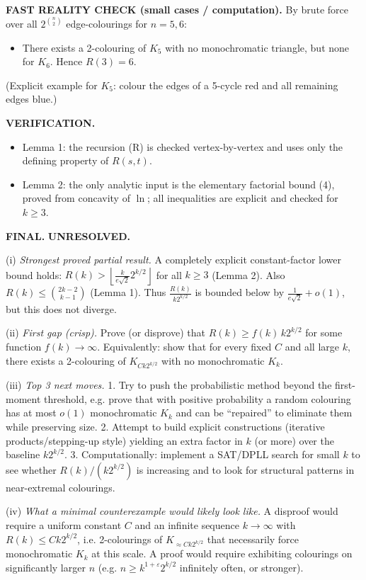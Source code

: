 \medskip
\textbf{FAST REALITY CHECK (small cases / computation).}
By brute force over all $2^{\binom{n}{2}}$ edge-colourings for $n=5,6$:
\begin{itemize}
\item There exists a 2-colouring of $K_5$ with no monochromatic triangle, but none for $K_6$.
Hence $R(3)=6$.
\end{itemize}
(Explicit example for $K_5$: colour the edges of a 5-cycle red and all remaining edges blue.)

\textbf{VERIFICATION.}
\begin{itemize}
\item Lemma 1: the recursion (R) is checked vertex-by-vertex and uses only the defining property of $R(s,t)$.
\item Lemma 2: the only analytic input is the elementary factorial bound (4), proved from concavity of $\ln$; all inequalities are explicit and checked for $k\ge 3$.
\end{itemize}

\textbf{FINAL.} \textbf{UNRESOLVED.}

(i) \emph{Strongest proved partial result.} A completely explicit constant-factor lower bound holds:
$R(k) > \left\lfloor \frac{k}{e\sqrt{2}}2^{k/2}\right\rfloor$ for all $k\ge 3$ (Lemma 2). Also $R(k)\le \binom{2k-2}{k-1}$ (Lemma 1).
Thus $\frac{R(k)}{k2^{k/2}}$ is bounded below by $\frac{1}{e\sqrt{2}}+o(1)$, but this does not diverge.

(ii) \emph{First gap (crisp).} Prove (or disprove) that $R(k)\ge f(k)\,k2^{k/2}$ for some function $f(k)\to\infty$.
Equivalently: show that for every fixed $C$ and all large $k$, there exists a 2-colouring of $K_{Ck2^{k/2}}$ with no monochromatic $K_k$.

(iii) \emph{Top 3 next moves.}
1. Try to push the probabilistic method beyond the first-moment threshold, e.g. prove that with positive probability a random colouring has at most $o(1)$ monochromatic $K_k$ and can be ``repaired'' to eliminate them while preserving size.
2. Attempt to build explicit constructions (iterative products/stepping-up style) yielding an extra factor in $k$ (or more) over the baseline $k2^{k/2}$.
3. Computationally: implement a SAT/DPLL search for small $k$ to see whether $R(k)/(k2^{k/2})$ is increasing and to look for structural patterns in near-extremal colourings.

(iv) \emph{What a minimal counterexample would likely look like.} A disproof would require a uniform constant $C$ and an infinite sequence $k\to\infty$ with $R(k)\le Ck2^{k/2}$, i.e. 2-colourings of $K_{\approx Ck2^{k/2}}$ that necessarily force monochromatic $K_k$ at this scale.
A proof would require exhibiting colourings on significantly larger $n$ (e.g. $n\ge k^{1+\varepsilon}2^{k/2}$ infinitely often, or stronger).





